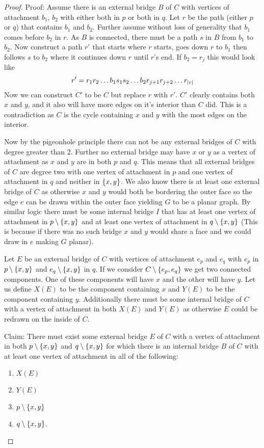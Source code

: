 \documentclass{article}
\begin{document}
\begin{proof}
	Proof: Assume there is an external bridge $B$ of $C$ with vertices of attachment $b_1$, $b_2$ with either both in $p$ or both in $q$. Let $r$ be the path (either $p$ or $q$) that contains $b_1$ and $b_2$. Further assume without loss of generality that $b_1$ comes before $b_2$ in $r$. As $B$ is connected, there must be a path $s$ in $B$ from $b_1$ to $b_2$. Now construct a path $r'$ that starts where $r$ starts, goes down $r$ to $b_1$ then follows $s$ to $b_2$ where it continues down $r$ until $r$'s end. If $b_2 = r_j$ this would look like
	$$
	r' = r_1r_2\ldots b_1s_1s_2\ldots b_2r_{j+1}r_{j+2}\ldots r_{\left| {r} \right|}
	$$
	Now we can construct $C'$ to be $C$ but replace $r$ with $r'$. $C'$ clearly contains both $x$ and $y$, and it also will have more edges on it's interior than $C$ did. This is a contradiction as $C$ is the cycle containing $x$ and $y$ with the most edges on the interior.
	
	Now by the pigeonhole principle there can not be any external bridges of $C$ with degree greater than 2. Further no external bridge may have $x$ or $y$ as a vertex of attachment as $x$ and $y$ are in both $p$ and $q$. This means that all external bridges of $C$ are degree two with one vertex of attachment in $p$ and one vertex of attachment in $q$ and neither in $\left\{ {x,y} \right\}$. We also know there is at least one external bridge of $C$ as otherwise $x$ and $y$ would both be bordering the outer face so the edge $e$ can be drawn within the outer face yielding $G$ to be a planar graph. By similar logic there must be some internal bridge $I$ that has at least one vertex of attachment in $p\setminus\left\{ {x,y} \right\}$ and at least one vertex of attachment in $q\setminus\left\{ {x,y} \right\}$ (This is because if there was no such bridge $x$ and $y$ would share a face and we could draw in $e$ making $G$ planar).
	
	Let $E$ be an external bridge of $C$ with vertices of attachment $e_p$ and $e_q$ with $e_p$ in $p\setminus\left\{ {x,y} \right\}$ and $e_q\setminus\left\{ {x,y} \right\}$ in $q$. If we consider $C\setminus\left\{ {e_p,e_q} \right\}$ we get two connected components. One of these components will have $x$ and the other will have $y$. Let us define $X(E)$ to be the component containing $x$ and $Y(E)$ to be the component containing $y$. Additionally there must be some internal bridge of $C$ with a vertex of attachment in both $X(E)$ and $Y(E)$ as otherwise $E$ could be redrawn on the inside of $C$.
	
	Claim: There must exist some external bridge $E$ of $C$ with a vertex of attachment in both $p\setminus\left\{ {x,y} \right\}$ and $q\setminus\left\{ {x,y} \right\}$ for which there is an internal bridge $B$ of $C$ with at least one vertex of attachment in all of the following:
	\begin{enumerate}
		\item $X(E)$
		\item $Y(E)$
		\item $p\setminus\left\{ {x,y} \right\}$
		\item $q\setminus\left\{ {x,y} \right\}$.
	\end{enumerate}


\end{proof}
\end{document}
